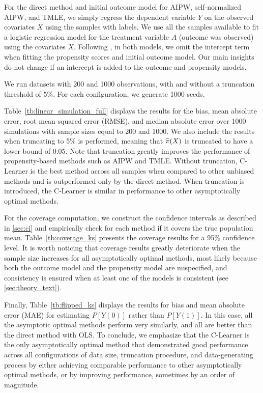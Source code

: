 For the direct method and initial outcome model for AIPW, self-normalized AIPW, and TMLE, we simply regress the dependent variable $Y$ on the observed covariates $X$ using the samples with labels. We use all the samples available to fit a logistic regression model for the treatment variable $A$ (outcome was observed) using the covariates $X$. Following \cite{KangSc07}, in both models, we omit the intercept term when fitting the propensity scores and initial outcome model. Our main insights do not change if an intercept is added to the outcome and propensity models.

We run datasets with 200 and 1000 observations, with and without a truncation threshold of $5\%$. For each configuration, we generate 1000 seeds. 


Table~\ref{tb:linear_simulation_full} displays the results for the bias, mean absolute error, root mean squared error (RMSE), and median absolute error over 1000 simulations with sample sizes equal to 200 and 1000. We also include the results when truncating to 5\% is performed, meaning that $\widehat{\pi}(X)$ is truncated to have a lower bound of 0.05. Note that truncation greatly improves the performance of propensity-based methods such as AIPW and TMLE. Without truncation, C-Learner is the best method across all samples when compared to other unbiased methods and is outperformed only by the direct method. When truncation is introduced, the C-Learner is similar in performance to other asymptotically optimal methods.

For the coverage computation, we construct the confidence intervals as described in \cref{sec:ci} and empirically check for each method if it covers the true population mean.
 Table~\ref{tb:coverage_ks} presents the coverage results for a 95\% confidence level. It is worth noticing that coverage results greatly deteriorate when the sample size increases for all asymptotically optimal methods, most likely because both the outcome model and the propensity model are mispecified, and consistency is ensured when at least one of the models is consistent (see \cref{sec:theory_text}).

 Finally, Table~\ref{tb:flipped_ks} displays the results for bias and mean absolute error (MAE) for estimating $P[Y(0)]$ rather than $P[Y(1)]$. In this case, all the asymptotic optimal methods perform very similarly, and all are better than the direct method with OLS. To conclude, we emphasize that the C-Learner is the only asymptotically optimal method that demonstrated good performance across all configurations of data size, truncation procedure, and data-generating process by either achieving comparable performance to other asymptotically optimal methods, or by improving performance, sometimes by an order of magnitude.




